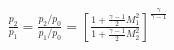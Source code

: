 \documentclass[10pt]{article}
\begin{document}
\begin{align*}\frac{p_2}{p_1}
=
\frac{p_2/p_0}{p_1/p_0}
=
\left[
\frac{
1 + \frac{\gamma-1}{2} M_1^{2}
}
{
1 + \frac{\gamma-1}{2} M_2^{2}
}
\right]^{\frac{\gamma}{\gamma-1}}\end{align*}
\end{document}
